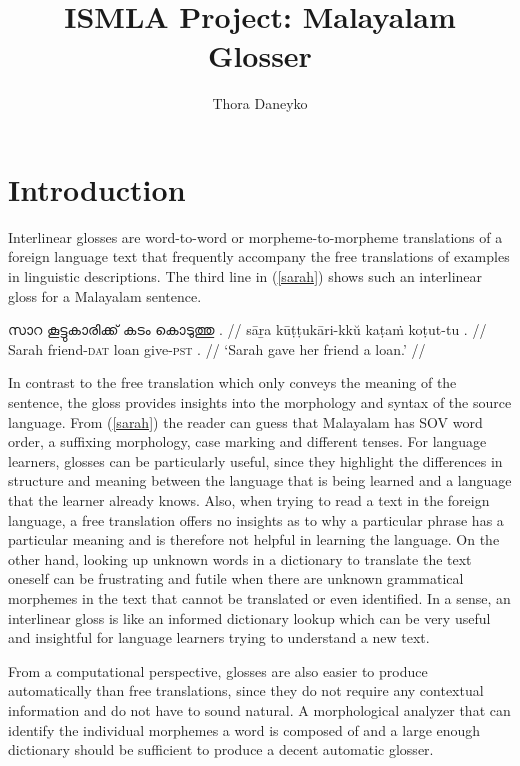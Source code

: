 \documentclass[a4paper]{article}
\author{Thora Daneyko}
\title{ISMLA Project: Malayalam Glosser}
\newcommand{\afx}[1]{\textsc{#1}}
\begin{document}
\maketitle

\setcounter{footnote}{-1}

\begingroup
{}

\section{Introduction}\label{sec:intro}

Interlinear glosses are word-to-word or morpheme-to-morpheme translations of a foreign language text that frequently accompany the free translations of examples in linguistic descriptions. The third line in (\ref{sarah}) shows such an interlinear gloss for a Malayalam sentence.

\ex\label{sarah}\begingl
\gla സാറ കൂട്ടുകാരിക്ക് കടം കൊടുത്തു . //
\glb sāṟa kūṭṭukāri-kkŭ kaṭaṁ koṭut-tu . //
\glc Sarah friend-\afx{dat} loan give-\afx{pst} . //
\glft `Sarah gave her friend a loan.' \parencite[p.~62]{asherKumari} //
\endgl\xe

In contrast to the free translation which only conveys the meaning of the sentence, the gloss provides insights into the morphology and syntax of the source language. From (\ref{sarah}) the reader can guess that Malayalam has SOV word order, a suffixing morphology, case marking and different tenses. For language learners, glosses can be particularly useful, since they highlight the differences in structure and meaning between the language that is being learned and a language that the learner already knows. Also, when trying to read a text in the foreign language, a free translation offers no insights as to why a particular phrase has a particular meaning and is therefore not helpful in learning the language. On the other hand, looking up unknown words in a dictionary to translate the text oneself can be frustrating and futile when there are unknown grammatical morphemes in the text that cannot be translated or even identified. In a sense, an interlinear gloss is like an informed dictionary lookup which can be very useful and insightful for language learners trying to understand a new text.

From a computational perspective, glosses are also easier to produce automatically than free translations, since they do not require any contextual information and do not have to sound natural. A morphological analyzer that can identify the individual morphemes a word is composed of and a large enough dictionary should be sufficient to produce a decent automatic glosser.
\end{document}
